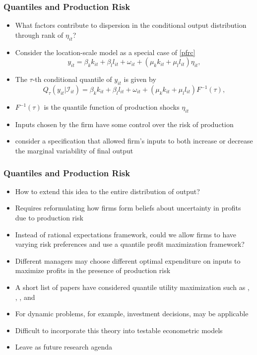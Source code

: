 \documentclass[xcolor={dvipsnames}, notheorems]{beamer}
\theoremstyle{plain}
\begin{document}
\begin{frame}
\frametitle{Quantiles and Production Risk}
\begin{itemize}
\item  What factors contribute to dispersion in the conditional output distribution through rank of $\eta_{it}$?
\item Consider the location-scale model as a special case of \eqref{pfrc}
\begin{equation} \label{locationscale}
    y_{it}=\beta_{k}k_{it}+\beta_{l}l_{it}+\omega_{it}+(\mu_{k}k_{it}+\mu_{l}l_{it})\eta_{it},
\end{equation}
\item The $\tau$-th conditional quantile of $y_{it}$ is given by
\begin{equation}
Q_{\tau}(y_{it}|\mathcal{I}_{it})=\beta_{k}k_{it}+\beta_{l}l_{it}+\omega_{it}+(\mu_{k}k_{it}+\mu_{l}l_{it})F^{-1}(\tau),
\end{equation}
\item $F^{-1}(\tau)$ is the quantile function of production shocks $\eta_{it}$
\item Inputs chosen by the firm have some control over the risk of production
\item  \cite{Just1978,Just1979} consider a specification that allowed firm's inputs to both increase or decrease the marginal variability of final output
\end{itemize}
\end{frame}


\begin{frame}
\frametitle{Quantiles and Production Risk}
\begin{itemize}
\item How to extend this idea to the entire distribution of output? 
\item Requires reformulating how firms form beliefs about uncertainty in profits due to production risk
\item Instead of rational expectations framework, could we allow firms to have varying risk preferences and use a quantile profit maximization framework?
\item Different managers may choose different optimal expenditure on inputs to maximize profits in the presence of production risk
\item A short list of papers have considered quantile utility maximization such as \cite{Manski1988}, \cite{ROSTEK2009}, \cite{Chambers2007}, and \cite{Bhattacharya2009}
\item For dynamic problems, for example, investment decisions, \cite{Castro2019} may be applicable
\item Difficult to incorporate this theory into testable econometric models
\item Leave as future research agenda
\end{itemize}
\end{frame}
\end{document}
